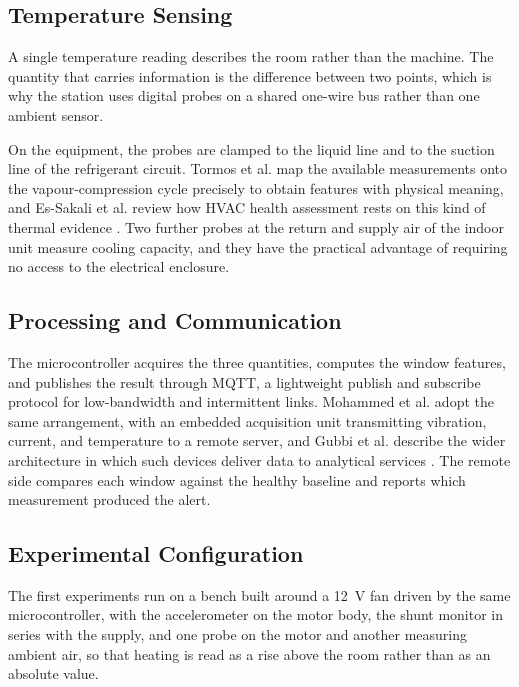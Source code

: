 \documentclass[english,hidelinks]{sbrt}
\begin{document}
\subsection{Temperature Sensing}

A single temperature reading describes the room rather than the machine. The quantity that carries information is the difference between two points, which is why the station uses digital probes on a shared one-wire bus rather than one ambient sensor.

On the equipment, the probes are clamped to the liquid line and to the suction line of the refrigerant circuit. Tormos et al. map the available measurements onto the vapour-compression cycle precisely to obtain features with physical meaning, and Es-Sakali et al. review how HVAC health assessment rests on this kind of thermal evidence \cite{tormos2026hvacxai,essakali2022hvac}. Two further probes at the return and supply air of the indoor unit measure cooling capacity, and they have the practical advantage of requiring no access to the electrical enclosure.

\subsection{Processing and Communication}

The microcontroller acquires the three quantities, computes the window features, and publishes the result through MQTT, a lightweight publish and subscribe protocol for low-bandwidth and intermittent links. Mohammed et al. adopt the same arrangement, with an embedded acquisition unit transmitting vibration, current, and temperature to a remote server, and Gubbi et al. describe the wider architecture in which such devices deliver data to analytical services \cite{mohammed2023iot,gubbi2013iot}. The remote side compares each window against the healthy baseline and reports which measurement produced the alert.

\subsection{Experimental Configuration}

The first experiments run on a bench built around a 12~V fan driven by the same microcontroller, with the accelerometer on the motor body, the shunt monitor in series with the supply, and one probe on the motor and another measuring ambient air, so that heating is read as a rise above the room rather than as an absolute value.
\end{document}

